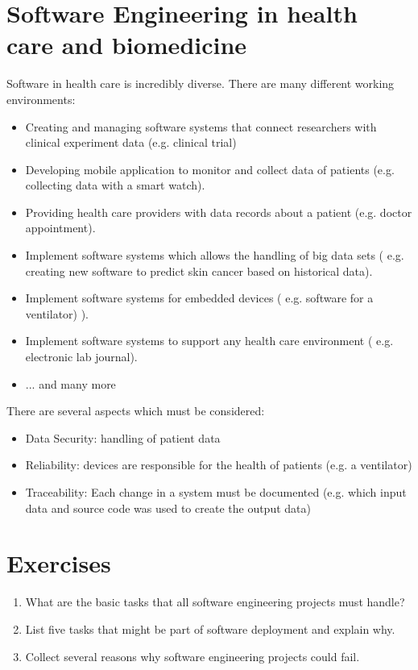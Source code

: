 \section{Software Engineering in health care and biomedicine}
Software in health care is incredibly diverse. There are
many different working environments:
\begin{itemize}
\item Creating and managing software systems that connect researchers with
clinical experiment data (e.g. clinical trial)
\item Developing mobile application to monitor and collect data of
patients (e.g. collecting data with a smart watch).
\item Providing health care providers with data records about a
patient (e.g. doctor appointment).
\item Implement software systems which allows the handling of big data sets (
e.g. creating new software to predict skin cancer based on historical data).
\item Implement software systems for embedded devices (
e.g. software for a ventilator)
).
\item Implement software systems to support any health care environment (
e.g. electronic lab journal).
\item ... and many more
\end{itemize}

There are several aspects which must be considered:

\begin{itemize}
\item Data Security: handling of patient data
\item Reliability: devices are responsible for the health of patients
(e.g. a ventilator)
\item Traceability: Each change in a system must be documented
(e.g. which input data and source code was used to create the output data)
\end{itemize}

\section{Exercises}
\begin{enumerate}
\item What are the basic tasks that all software engineering projects must handle?
\item List five tasks that might be part of software deployment and explain why.
\item Collect several reasons why software engineering projects could fail.
\end{enumerate}

%
